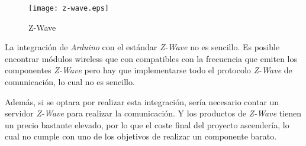 \begin{figure}[H]
    \centering
    \texttt{[image: z-wave.eps]}
    \caption{Z-Wave}\label{fig:z-wave}
\end{figure}

La integración de \emph{Arduino} con el estándar \emph{Z-Wave} no es sencillo. Es posible encontrar módulos wireless que con compatibles con la frecuencia que emiten los componentes \emph{Z-Wave} pero hay que implementarse todo el protocolo \emph{Z-Wave} de comunicación, lo cual no es sencillo.

Además, si se optara por realizar esta integración, sería necesario contar un servidor \emph{Z-Wave} para realizar la comunicación. Y los productos de \emph{Z-Wave} tienen un precio bastante elevado, por lo que el coste final del proyecto ascendería, lo cual no cumple con uno de los objetivos de realizar un componente barato.